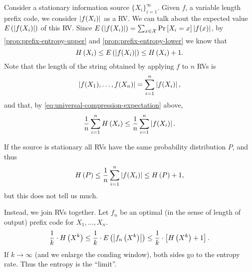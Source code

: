 Consider a stationary information source $\{X_i\}_{i=1}^\infty$.
Given $f$, a variable length prefix code, we consider $\left|{f(X_i)}\right|$ as a \ac{RV}.
We can talk about the expected value $E \left({\left|{f(X_i)}\right|}\right)$ of this \ac{RV}.
Since $E \left({\left|{f(X_i)}\right|}\right) = \sum_{x \in \mathcal{X}} \mathop{\mathrm{Pr}}\limits_{} \left[ {X_i = x} \right] \left|{f(x)}\right|$, by \cref{prop:prefix-entropy-upper} and \cref{prop:prefix-entropy-lower} we know that
\begin{equation} \label{eq:universal-compression-expectation}
	H\left({X_i}\right) \le E \left({\left|{f(X_i)}\right|}\right) \le H\left({X_i}\right) + 1.
\end{equation}
Note that the length of the string obtained by applying $f$ to $n$ \acp{RV} is
\begin{equation*}
	\left|{f(X_1), \dots, f(X_n)}\right| = \sum_{i=1}^n \left|{f(X_i)}\right|,
\end{equation*}
and that, by \cref{eq:universal-compression-expectation} above,
\begin{equation*}
	\frac{1}{n} \sum_{i=1}^n H\left({X_i}\right)
	\le
	\frac{1}{n} \sum_{i=1}^n \left|{f(X_i)}\right|.
\end{equation*}

If the source is stationary all \acp{RV} have the same probability distribution $P$, and thus
\begin{equation*}
	H\left({P}\right) \le \frac{1}{n} \sum_{i = 1}^n \left|{f(X_i)}\right| \le H\left({P}\right) + 1,
\end{equation*}
but this does not tell us much.

Instead, we join \acp{RV} together.
Let $f_n$ be an optimal (in the sense of length of output) prefix code for $X_1, \dots, X_n$.
\begin{equation*}
	\frac{1}{k} \cdot H\left({X^k}\right)
	\le
	\frac{1}{k} \cdot E \left({\left|{f_n \left( X^k \right)}\right|}\right)
	\le
	\frac{1}{k} \cdot \left[ H\left({X^k}\right) + 1 \right].
\end{equation*}
If $k \to \infty$ (and we enlarge the conding window), both sides go to the entropy rate.
Thus the entropy is the ``limit''.
